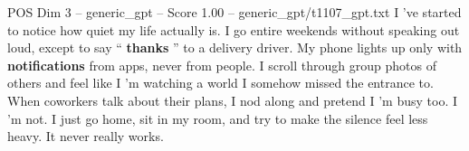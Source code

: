 \begin{textsample}{POS Dim 3 – generic\_gpt – Score 1.00 – generic\_gpt/t1107\_gpt.txt}  \label{ex:f3_pos_032}
I ’ve started to notice how quiet my life actually is.
I go entire weekends without speaking out loud, except to say “ \textbf{thanks} ” to a delivery driver.
My phone lights up only with \textbf{notifications} from apps, never from people.
I scroll through group photos of others and feel like I ’m watching a world I somehow missed the entrance to.
When coworkers talk about their plans, I nod along and pretend I ’m busy too.
I ’m not.
I just go home, sit in my room, and try to make the silence feel less heavy.
It never really works.

\end{textsample}

